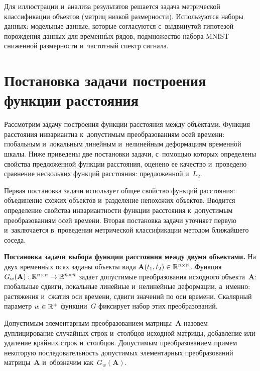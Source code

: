 \begin{multicols}{2}
Для иллюстрации и~анализа результатов решается задача метрической 
классификации объектов (матриц низкой размерности). Используются наборы данных: 
модельные данные, которые согласуются с~выдвинутой гипотезой порождения 
данных для временн$\acute{\mbox{ы}}$х рядов, подмножество набора MNIST сниженной 
размерности и~частотный спектр сигнала.

\vspace*{-10pt}

\section{Постановка задачи построения функции расстояния}

\vspace*{-2pt}

Рассмотрим задачу построения функции расстояния между объектами. 
Функция расстояния инвариантна к~допустимым преобразованиям осей времени: 
глобальным и~локальным линейным и~нелинейным деформациям временн$\acute{\mbox{о}}$й шкалы. 
Ниже приведены две постановки задачи, с~помощью которых определены свойства 
предложенной функции расстояния, оценено ее качество и~проведено сравнение 
нескольких функций расстояния: предложенной и~$L_2$.

Первая постановка задачи использует общее свойство функций расстояния: 
объединение схожих объектов и~разделение непохожих объектов. 
Вводится определение свойства инвариантности функции расстояния к~допустимым 
преобразованиям осей времени.
Вторая постановка задачи уточняет первую и~заключается в~проведении метрической 
классификации методом ближайшего соседа.

\textbf{Постановка задачи выбора функции расстояния между двумя объектами.}
На двух временн$\acute{\mbox{ы}}$х осях заданы объекты вида 
$\textbf{A}(t_1,t_2)\hm \in \mathbb{R}^{n \times n}$. 
Функция $G_w(\textbf{A}):\mathbb{R}^{n \times n} \hm\rightarrow 
\mathbb{R}^{\hat{n} \times \hat{n}}$ задает допустимые преобразования 
исходного объекта~$\textbf{A}$: глобальные сдвиги, локальные линейные 
и~нелинейные деформации, а~именно: растяжения и~сжатия оси времени, 
сдвиги значений по оси времени. Скалярный параметр $w \hm\in \mathbb{R}^+$
 функции~$G$ фиксирует набор этих преобразований.

Допустимым элементарным преобразованием матрицы~$\textbf{A}$ назовем 
дуплицирование случайных строк и~столбцов исходной матрицы, добавление 
или удаление крайних строк и~столбцов. Допустимым преобразованием 
примем некоторую последовательность допустимых элементарных 
преобразований матрицы~$\textbf{A}$ и~обозначим как~$G_w(\textbf{A})$.


\end{multicols}

